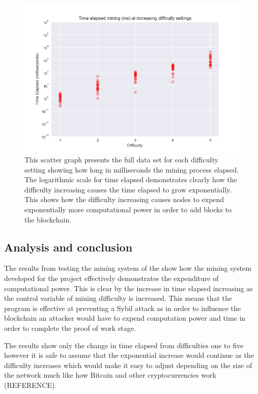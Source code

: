 \documentclass{l4proj}
\begin{document}
\begin{figure}[!ht]
    \centering
    \includegraphics[width=1\linewidth]{images/fulldatascatter.png}    
    \caption
    {
        This scatter graph presents the full data set for each difficulty setting showing how long in milliseconds
        the mining process elapsed. The logarithmic scale for time elapsed demonstrates clearly how the difficulty
        increasing causes the time elapsed to grow exponentially. This shows how the difficulty increasing causes
        nodes to expend exponentially more computational power in order to add blocks to the blockchain.
    }
    \label{fig:fulldatascatter} 
\end{figure}

\subsection{Analysis and conclusion}
The results from testing the mining system of the show how the mining system developed for the project effectively
demonstrates the expenditure of computational power. This is clear by the increase in time elapsed increasing as the
control variable of mining difficulty is increased. This means that the program is effective at preventing a Sybil attack
as in order to influence the blockchain an attacker would have to expend computation power and time in order to complete
the proof of work stage.

The results show only the change in time elapsed from difficulties one to five however it is safe to assume that the
exponential increase would continue as the difficulty increases which would make it easy to adjust depending on the
size of the network much like how Bitcoin and other cryptocurrencies work (REFERENCE).
\end{document}
